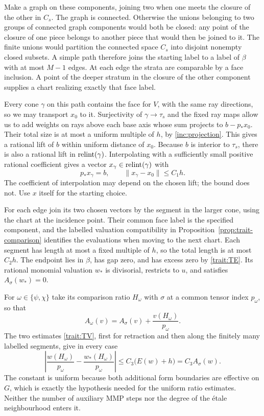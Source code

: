 Make a graph on these components, joining two when one meets the
closure of the other in $C_s$.  The graph is connected.  Otherwise
the unions belonging to two groups of connected graph components
would both be closed: any point of the closure of one piece belongs
to another piece that would then be joined to it.  The finite unions
would partition the connected space $C_s$ into disjoint nonempty
closed subsets.  A simple path therefore joins the starting label
to a label of $\beta$ with at most $M-1$ edges.  At each edge the
strata are comparable by a face inclusion.  A point of the deeper
stratum in the closure of the other component supplies a chart
realizing exactly that face label.

Every cone $\gamma$ on this path contains the face for $V$, with
the same ray directions, so we may transport $x_0$ to it.  Surjectivity
of $\gamma\to\tau_s$ and the fixed ray maps allow us to add weights
on rays above each base axis whose sum projects to $b-p_*x_0$.
Their total size is at most a uniform multiple of $h$, by
\eqref{inc:projection}.  This gives a rational lift of $b$ within
uniform distance of $x_0$.  Because $b$ is interior to $\tau_s$,
there is also a rational lift in $\operatorname{relint}(\gamma)$.  Interpolating
with a sufficiently small positive rational coefficient gives a
vector $x_\gamma\in\operatorname{relint}(\gamma)$ with
\[
 p_*x_\gamma=b,\qquad
 \|x_\gamma-x_0\|\leq C_1h.
\]
The coefficient of interpolation may depend on the chosen lift;
the bound does not.  Use $x$ itself for the starting choice.

For each edge join its two chosen vectors by the segment in the
larger cone, using the chart at the incidence point.  Their common
face label is the specified component, and the labelled valuation
compatibility in Proposition~\ref{prop:trait-comparison} identifies
the evaluations when moving to the next chart.  Each segment has
length at most a fixed multiple of $h$, so the total length is at
most $C_2h$.  The endpoint lies in $\beta$, has gap zero, and has
excess zero by \eqref{trait:TE}.  Its rational monomial valuation
$w_*$ is divisorial, restricts to $u$, and satisfies
$A_\sigma(w_*)=0$.

For $\omega\in\{\psi,\chi\}$ take its comparison ratio $H_\omega$
with $\sigma$ at a common tensor index $p_\omega$, so that
\[
 A_\omega(v)=A_\sigma(v)+\frac{v(H_\omega)}{p_\omega}.
\]
The two estimates \eqref{trait:TV}, first for retraction and then
along the finitely many labelled segments, give in every case
\begin{equation}\label{inc:ratio-path}
 \left|\frac{w(H_\omega)}{p_\omega}
       -\frac{w_*(H_\omega)}{p_\omega}\right|
 \leq C_3\bigl(E(w)+h\bigr)=C_3 A_\sigma(w).
\end{equation}
The constant is uniform because both additional form boundaries are
effective on $G$, which is exactly the hypothesis needed for the
uniform ratio estimates.  Neither the number of auxiliary MMP steps
nor the degree of the \'{e}tale neighbourhood enters it.

